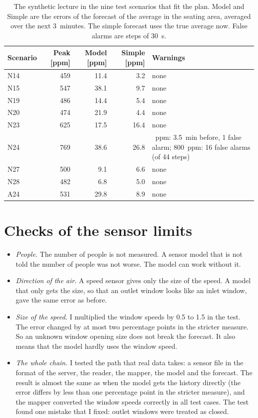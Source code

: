 \begin{table}[h]
  \centering
  \caption[Lecture in all test scenarios that fit the plan.]{The synthetic lecture in the nine test scenarios that fit
  the plan. Model and Simple are the errors of the forecast of the average \cotwo{} in the seating area, averaged
  over the next 3~minutes. The simple forecast uses the true average now. False alarms are steps of 30~s.}
  \label{tab:lectures}
  \small
  \begin{tabular}{lrrr>{\raggedright\arraybackslash}p{4.6cm}}
    \toprule
    Scenario & Peak [ppm] & Model [ppm] & Simple [ppm] & Warnings\\
    \midrule
    N14 & 459 & 11.4 & 3.2 & none\\
    N15 & 547 & 38.1 & 9.7 & none\\
    N19 & 486 & 14.4 & 5.4 & none\\
    N20 & 474 & 21.9 & 4.4 & none\\
    N23 & 625 & 17.5 & 16.4 & none\\
    N24 & 769 & 38.6 & 26.8 & 700~ppm: 3.5~min before, 1 false alarm; 800~ppm: 16 false alarms (of 44 steps)\\
    N27 & 500 & 9.1 & 6.6 & none\\
    N28 & 482 & 6.8 & 5.0 & none\\
    A24 & 531 & 29.8 & 8.9 & none\\
    \bottomrule
  \end{tabular}
\end{table}

\section{Checks of the sensor limits}
\label{sec:sensorchecks}
\begin{itemize}
  \item \emph{People.} The number of people is not measured. A sensor model that is not told the number of people
        was not worse. The model can work without it.
  \item \emph{Direction of the air.} A speed sensor gives only the size of the speed. A model that only gets the
        size, so that an outlet window looks like an inlet window, gave the same error as before.
  \item \emph{Size of the speed.} I multiplied the window speeds by 0.5 to 1.5 in the test. The error changed by
        at most two percentage points in the stricter measure. So an unknown window opening size does not break the
        forecast. It also means that the model hardly uses the window speed.
  \item \emph{The whole chain.} I tested the path that real data takes: a sensor file in the format of the
        server, the reader, the mapper, the model and the forecast. The result is almost the same as when the
        model gets the history directly (the error differs by less than one percentage point in the stricter
        measure), and the mapper converted the window speeds correctly in all test cases. The test found one
        mistake that I fixed: outlet windows were treated as closed.
\end{itemize}

